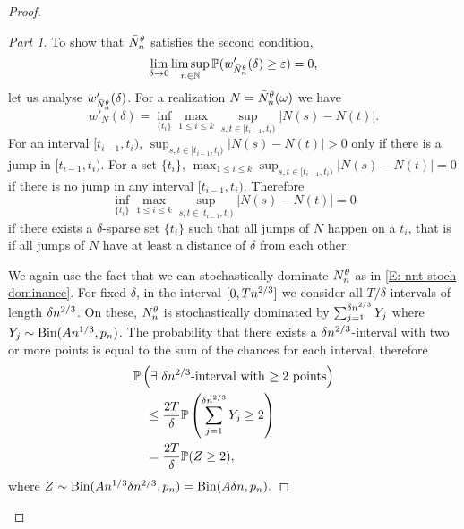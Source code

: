 \begin{proof}
\begin{proof}[Part 1]
\bigskip

To show that $\bar{N}_n^{\theta}$ satisfies the second condition,
\begin{equation} \label{E: tightness cond 2}
\lim_{\delta \rightarrow 0} \limsup_{n \in \mathbb{N}}\mathbb{P}(w'_{\bar{N}_n^{\theta}}(\delta) \geq \varepsilon ) = 0,
\end{equation}
let us analyse $w'_{\bar{N}_n^{\theta}}(\delta)$.
For a realization $N = \bar{N}_n^{\theta}(\omega)$ we have
\begin{equation*}
w'_{N}(\delta) = \inf_{\{t_i\}} \max_{1\leq i \leq k} \sup_{s,t \in [t_{i-1}, t_i)} |N(s) - N(t)|.
\end{equation*}
For an interval $[t_{i-1}, t_i)$, 
$\sup_{s,t \in [t_{i-1}, t_i)} |N(s) - N(t)| > 0$ only if there is a jump in $[t_{i-1}, t_i)$.
For a set $\{t_i\}$, $\max_{1\leq i \leq k} \sup_{s,t \in [t_{i-1}, t_i)} |N(s) - N(t)| = 0$ if there is no jump in any interval $[t_{i-1}, t_i)$.
Therefore
\begin{equation*}
\inf_{\{t_i\}} \max_{1\leq i \leq k} \sup_{s,t \in [t_{i-1}, t_i)} |N(s) - N(t)| = 0
\end{equation*}
if there exists a $\delta$-sparse set $\{t_i\}$ such that all jumps of $N$ happen on a $t_i$,
that is if all jumps of $N$ have at least a distance of $\delta$ from each other.

We again use the fact that we can stochastically dominate $N_n^{\theta}$ as in \eqref{E: nnt stoch dominance}.
For fixed $\delta$, in the interval $[0, Tn^{2 / 3}]$ we consider all $T/\delta$ intervals of length $\delta n^{2 / 3}$.
On these, $N_n^{\theta}$ is stochastically dominated by $\sum_{j = 1}^{\delta n^{2 / 3}} Y_j$ where $Y_j \sim \operatorname*{Bin}(An^{1 / 3}, p_n)$.
The probability that there exists a $\delta n^{2 / 3}$-interval with two or more points is equal to the sum of the chances for each interval,
therefore
\begin{equation*}
\begin{aligned}
&\mathbb{P}\left( \text{$\exists$ $\delta n^{2 / 3}$-interval with $\geq 2$ points} \right) \\
&\quad\leq \frac{2T}{\delta} \mathbb{P}\left( \sum_{j = 1}^{\delta n^{2 / 3}} Y_j \geq 2 \right) \\
&\quad=  \frac{2T}{\delta} \mathbb{P}( Z \geq 2 ),
\end{aligned}
\end{equation*}
where $Z \sim \operatorname*{Bin}(An^{1 / 3}\delta n^{2 / 3}, p_n) = \operatorname*{Bin}(A\delta n, p_n).$


\end{proof}
\end{proof}
